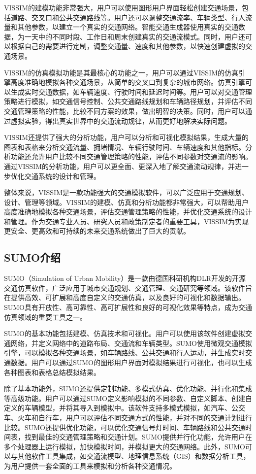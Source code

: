 VISSIM的建模功能非常强大，用户可以使用图形用户界面轻松创建交通场景，包括道路、交叉口和公共交通路线等。用户还可以调整交通流率、车辆类型、行人流量和其他参数，以建立一个真实的交通网络。智能交通生成器使用真实的交通数据，为一天中的不同时段、工作日和周末创建真实的交通流模式。同时，用户还可以根据自己的需要进行定制，调整交通量、速度和其他参数，以快速创建虚拟的交通场景。

VISSIM的仿真模拟功能是其最核心的功能之一，用户可以通过VISSIM的仿真引擎高度准确地模拟各种交通场景，从简单的交叉口到复杂的城市网络。仿真引擎可以生成实时交通数据，如车辆速度、行驶时间和延迟时间等。用户可以对交通管理策略进行模拟，如交通信号控制、公共交通路线规划和车辆路径规划，并评估不同交通管理策略的性能，比较不同方案的效果，做出明智的决策。同时，用户可以通过虚拟实验，得出真实世界中的交通流动规律，从而更好地解决实际问题。

VISSIM还提供了强大的分析功能，用户可以分析和可视化模拟结果，生成大量的图表和表格来分析交通流量、拥堵情况、车辆行驶时间、车辆速度和其他指标。分析功能还允许用户比较不同交通管理策略的性能，评估不同参数对交通流的影响。通过VISSIM的分析功能，用户可以更全面、更深入地了解交通流动规律，并进一步优化交通系统的设计和管理。

整体来说，VISSIM是一款功能强大的交通模拟软件，可以广泛应用于交通规划、设计、管理等领域。VISSIM的建模、仿真和分析功能都非常强大，可以帮助用户高度准确地模拟各种交通场景，评估交通管理策略的性能，并优化交通系统的设计和管理。作为交通专业人员、研究人员和政策制定者的重要工具，VISSIM为实现更安全、更高效和可持续的未来交通系统做出了巨大的贡献。


\subsection{SUMO介绍}

SUMO（Simulation of Urban Mobility）是一款由德国科研机构DLR开发的开源交通仿真软件，广泛应用于城市交通规划、交通管理、交通研究等领域。该软件旨在提供高效、可扩展和高度自定义的交通仿真，以及良好的可视化和数据输出。SUMO具有开放性、高可靠性、高可扩展性和良好的可视化效果等特点，成为交通仿真领域的重要工具之一。

SUMO的基本功能包括建模、仿真技术和可视化。用户可以使用该软件创建虚拟交通网络，并定义网络中的道路布局、交通流和车辆类型。SUMO使用微观交通模拟引擎，可以模拟各种交通场景，如车辆路线、公共交通和行人运动，并生成实时交通数据。用户可以通过SUMO的图形用户界面对模拟结果进行可视化，也可以生成各种图表和表格总结模拟结果。

除了基本功能外，SUMO还提供定制功能、多模式仿真、优化功能、并行化和集成等高级功能。用户可以通过SUMO定义影响模拟的不同参数、自定义脚本、创建自定义的车辆模型，并将其导入到模拟中。该软件支持多模式模拟，如汽车、公交车、火车和自行车，用户可以评估不同交通方式的性能，并对不同的交通计划进行比较。SUMO还提供优化功能，可以优化交通信号灯时间、车辆路线和公共交通时间表，找到最佳的交通管理策略和交通计划。SUMO提供并行化功能，允许用户在多个处理器上运行模拟，加快模拟时间，并模拟更大的交通网络。此外，SUMO可以与其他软件工具集成，如交通流模型、地理信息系统（GIS）和数据分析工具，为用户提供一套全面的工具来模拟和分析各种交通情况。

